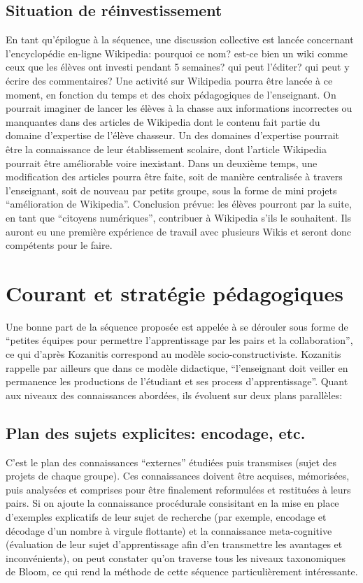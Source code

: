 \documentclass[11pt,bibliography=totoc]{scrartcl}
\begin{document}
\subsection{Situation de réinvestissement}
En tant qu'épilogue à la séquence, une discussion collective est lancée
concernant l'encyclopédie en-ligne Wikipedia: pourquoi ce nom? est-ce bien un
wiki comme ceux que les élèves ont investi pendant 5 semaines? qui peut
l'éditer? qui peut y écrire des commentaires?
Une activité sur Wikipedia pourra être lancée à ce moment, en fonction du temps et des choix pédagogiques de l'enseignant.
On pourrait imaginer de lancer les élèves à la chasse aux informations incorrectes ou manquantes dans des articles de Wikipedia dont le contenu fait partie du domaine d'expertise de l'élève chasseur. Un des domaines d'expertise pourrait être la connaissance de leur établissement scolaire, dont l'article Wikipedia pourrait être améliorable voire inexistant.
Dans un deuxième temps, une modification des articles pourra être faite, soit de manière centralisée à travers l'enseignant, soit de nouveau par petits groupe, sous la forme de mini projets ``amélioration de Wikipedia''.
Conclusion prévue: les élèves pourront par la suite, en tant que ``citoyens
numériques'', contribuer à Wikipedia s'ils le souhaitent. Ils auront eu une
première expérience de travail avec plusieurs Wikis et seront donc compétents pour le faire.

\section{Courant et stratégie pédagogiques}

Une bonne part de la séquence proposée est appelée à se dérouler sous forme de
``petites équipes pour permettre l'apprentissage par les pairs et la
collaboration'', ce qui d'après Kozanitis \cite{kozanitis} correspond au modèle
socio-constructiviste. Kozanitis rappelle par ailleurs que dans ce modèle
didactique, ``l'enseignant doit veiller en permanence les productions de
l'étudiant et ses process d'apprentissage''.
Quant aux niveaux des connaissances abordées, ils évoluent sur deux plans parallèles:
\subsection{Plan des sujets explicites: encodage, etc.}
C'est le plan des connaissances ``externes'' étudiées puis transmises (sujet des projets de chaque groupe).
Ces connaissances doivent être acquises, mémorisées, puis analysées et comprises pour être finalement reformulées et restituées à leurs pairs. Si on ajoute la connaissance procédurale consisitant en la mise en place d'exemples explicatifs de leur sujet de recherche (par exemple, encodage et décodage d'un nombre à virgule flottante) et la connaissance meta-cognitive (évaluation de leur sujet d'apprentissage afin d'en transmettre les avantages et inconvénients), on peut constater qu'on traverse tous les niveaux taxonomiques de Bloom, ce qui rend la méthode de cette séquence particulièrement intéressante.
\end{document}
